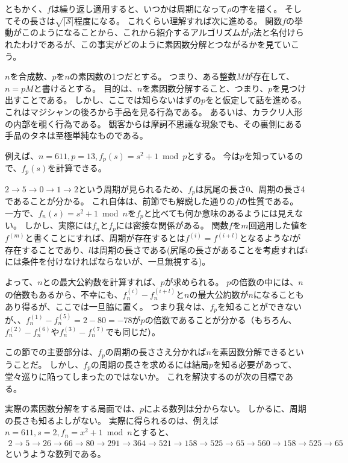 ともかく、$f$は繰り返し適用すると、いつかは周期になって$\rho$の字を描く。
そしてその長さは$\sqrt{|\mathcal{S}|}$程度になる。
これくらい理解すれば次に進める。
関数$f$の挙動がこのようになることから、これから紹介するアルゴリズムが$\rho$法と名付けられたわけであるが、この事実がどのように素因数分解とつながるかを見ていこう。

$n$を合成数、$p$を$n$の素因数の1つだとする。
つまり、ある整数$M$が存在して、$n=pM$と書けるとする。
目的は、$n$を素因数分解すること、つまり、$p$を見つけ出すことである。
しかし、ここでは知らないはずの$p$をと仮定して話を進める。
これはマジシャンの後ろから手品を見る行為である。
あるいは、カラクリ人形の内部を覗く行為である。
観客からは摩訶不思議な現象でも、その裏側にある手品のタネは至極単純なものである。

例えば、$n=611, p=13,f_p(s)=s^2+1\bmod{p}$とする。
今は$p$を知っているので、$f_p(s)$を計算できる。

$2\to5\to0\to1\to2$という周期が見られるため、$f_p$は尻尾の長さ0、周期の長さ4であることが分かる。
これ自体は、前節でも解説した通りの$f$の性質である。
一方で、$f_n(s)=s^2+1\bmod{n}$を$f_p$と比べても何か意味のあるようには見えない。
しかし、実際には$f_n$と$f_p$には密接な関係がある。
関数$f$を$m$回適用した値を$f^{(m)}$と書くことにすれば、周期が存在するとは$f^{(i)}=f^{(i+l)}$となるような$l$が存在することであり、$l$は周期の長さである(尻尾の長さがあることを考慮すれば$i$には条件を付けなければならないが、一旦無視する)。

よって、$n$との最大公約数を計算すれば、$p$が求められる。
$p$の倍数の中には、$n$の倍数もあるから、不幸にも、$f_n^{(i)}-f_n^{(i + l)}$と$n$の最大公約数が$n$になることもあり得るが、ここでは一旦脇に置く。
つまり我々は、$f_p$を知ることができないが、、$f_n^{(1)}-f_n^{(5)}=2-80=-78$が$p$の倍数であることが分かる（もちろん、$f_n^{(2)}-f_n^{(6)}$や$f_n^{(3)}-f_n^{(7)}$でも同じだ）。

この節での主要部分は、$f_p$の周期の長ささえ分かれば$n$を素因数分解できるということだ。
しかし、$f_p$の周期の長さを求めるには結局$p$を知る必要があって、堂々巡りに陥ってしまったのではないか。
これを解決するのが次の目標である。

実際の素因数分解をする局面では、$p$による数列は分からない。
しかるに、周期の長さも知るよしがない。
実際に得られるのは、例えば$n=611,s=2,f_n=x^2+1\bmod{n}$とすると、
\begin{align*}
2 \to 5 \to 26 \to 66 \to 80 \to 291 \to 364 \to 521 \to 158 \to 525 \to 65 \to 560 \to 158 \to 525 \to 65
\end{align*}
というような数列である。

